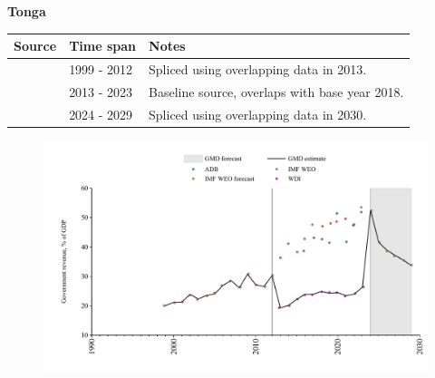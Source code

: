 \documentclass[12pt,a4paper,landscape]{article}
\begin{document}
\begin{adjustbox}{max totalsize={\paperwidth}{\paperheight},center}
\begin{minipage}[t][\textheight][t]{\textwidth}
\vspace*{0.5cm}
{}
\begin{center}
{\Large\bfseries Tonga}
\end{center}
\vspace{0.5cm}
\begin{table}[H]
\centering
\small
\begin{tabular}{|l|l|l|}
\hline
\textbf{Source} & \textbf{Time span} & \textbf{Notes} \\
\hline
\rowcolor{white}\cite{IMF_WEO}& 1999 - 2012 &Spliced using overlapping data in 2013.\\
\rowcolor{lightgray}\cite{WDI}& 2013 - 2023 &Baseline source, overlaps with base year 2018.\\
\rowcolor{white}\cite{IMF_WEO_forecast}& 2024 - 2029 &Spliced using overlapping data in 2030.\\
\hline
\end{tabular}
\end{table}
\begin{figure}[H]
\centering
\includegraphics[width=\textwidth,height=0.6\textheight,keepaspectratio]{graphs/TON_govrev_GDP.pdf}
\end{figure}
\end{minipage}
\end{adjustbox}
\end{document}
